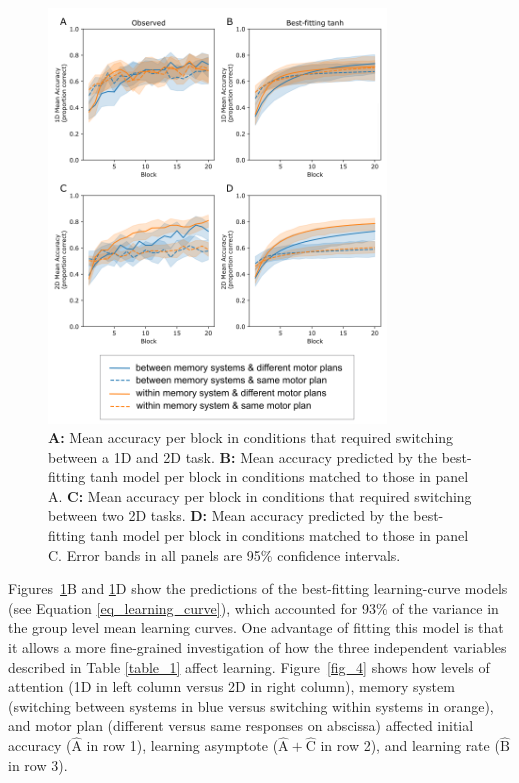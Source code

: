 \documentclass[doc, floatsintext]{apa7}
\begin{document}
\begin{figure}[h!]
    \centering
    \includegraphics[width=0.8\textwidth]{../figures/fig3.png}
    \caption{
        \textbf{A:} Mean accuracy per block in conditions that
        required switching between a 1D and 2D task.
        \textbf{B:} Mean accuracy predicted by the best-fitting
        tanh model per block in conditions matched to those in
        panel A.
        \textbf{C:} Mean accuracy per block in conditions that
        required switching between two 2D tasks.
        \textbf{D:} Mean accuracy predicted by the best-fitting
        tanh model per block in conditions matched to those in
        panel C.  Error bands in all panels are 95\% confidence
        intervals.
    }
    \label{fig_3}
\end{figure}

Figures~\ref{fig_3}B and \ref{fig_3}D show the predictions
of the best-fitting learning-curve models (see Equation
\ref{eq_learning_curve}), which accounted for 93\% of the
variance in the group level mean learning curves. One
advantage of fitting this model is that it allows a more
fine-grained investigation of how the three independent
variables described in Table \ref{table_1} affect learning.
Figure~\ref{fig_4} shows how levels of attention (1D in left
column versus 2D in right column), memory system (switching
between systems in blue versus switching within systems in
orange), and motor plan (different versus same responses on
abscissa) affected initial accuracy ($\hat{\text{A}}$ in row
1), learning asymptote ($\hat{\text{A}}+\hat{\text{C}}$ in
row 2), and learning rate ($\hat{\text{B}}$ in row 3).
\end{document}

